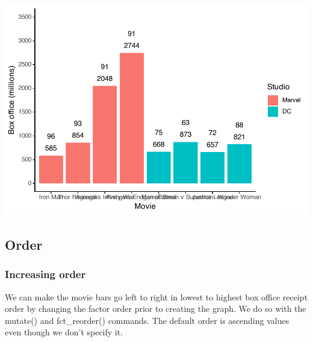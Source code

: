 \documentclass[
]{krantz}
\makeatletter
\newenvironment{Shaded}{\begin{snugshade}}{\end{snugshade}}
\newcommand{\DataTypeTok}[1]{\textcolor[rgb]{0.27,0.27,0.27}{#1}}
\newcommand{\KeywordTok}[1]{\textcolor[rgb]{0.27,0.27,0.27}{\textbf{#1}}}
\newcommand{\NormalTok}[1]{#1}
\newcommand{\OperatorTok}[1]{\textcolor[rgb]{0.43,0.43,0.43}{\textbf{#1}}}
\newcommand{\StringTok}[1]{\textcolor[rgb]{0.5,0.5,0.5}{#1}}
\newenvironment{kframe}{%
\medskip{}
\setlength{\fboxsep}{.8em}
 \def\at@end@of@kframe{}%
 \ifinner\ifhmode%
  \def\at@end@of@kframe{\end{minipage}}%
  \begin{minipage}{\columnwidth}%
 \fi\fi%
 \def\FrameCommand##1{\hskip\@totalleftmargin \hskip-\fboxsep
 \colorbox{shadecolor}{##1}\hskip-\fboxsep
     \hskip-\linewidth \hskip-\@totalleftmargin \hskip\columnwidth}%
 \MakeFramed {\advance\hsize-\width
   \@totalleftmargin\z@ \linewidth\hsize
   \@setminipage}}%
 {\par\unskip\endMakeFramed%
 \at@end@of@kframe}
\renewenvironment{Shaded}{\begin{kframe}}{\end{kframe}}
\makeatother
\begin{document}
\includegraphics[width=0.65\linewidth]{bookdown_files/figure-latex/unnamed-chunk-125-1}

\hypertarget{order}{%
\subsection{Order}\label{order}}

\hypertarget{increasing-order}{%
\subsubsection{Increasing order}\label{increasing-order}}

We can make the movie bars go left to right in lowest to highest box office receipt order by changing the factor order prior to creating the graph. We do so with the mutate() and fct\_reorder() commands. The default order is ascending values even though we don't specify it.

\begin{Shaded}
\end{Shaded}
\end{document}
